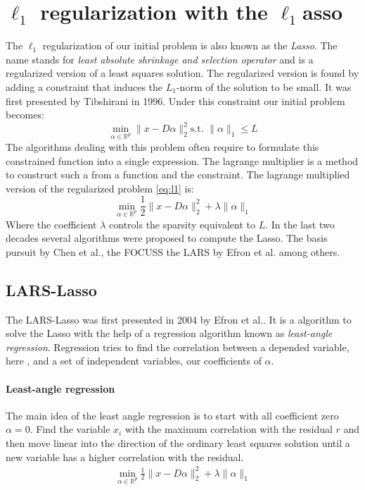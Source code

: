 \section {$\ell_1$ regularization with the $\ell_1$asso}
The $\ell_1$ regularization of our initial problem is also known as the
\emph{Lasso}. The name stands for \emph{least absolute shrinkage and
selection operator} and is a regularized version of a least squares
solution. The regularized version is found by adding a constraint that induces
the $L_1$-norm of the solution to be small. It was first presented by Tibshirani
in 1996\cite{Tibshirani1996}. Under this constraint our initial problem becomes:
\begin{equation}
\min_{\alpha\in\mathbb{R}^{p}} \lVert x - D\alpha \rVert^{2}_{2} \textrm{
s.t. } \lVert \alpha \rVert_{1} \leq L \label{eq:l1}
\end{equation}
The algorithms dealing with this problem often require to formulate this
constrained function into a single expression. The lagrange multiplier is a
method to construct such a  from a function and the constraint. The lagrange
multiplied version of the regularized problem \ref{eq:l1} is:
\begin{equation}
\min_{\alpha\in\mathbb{R}^{p}}  \frac{1}{2} \lVert x - D\alpha \rVert^{2}_{2} +
\lambda \lVert \alpha \rVert_{1}\label{eq:l1lagrange}
\end{equation}
Where the coefficient $\lambda$ controls the sparsity equivalent to $L$.
In the last two decades several algorithms were proposed to compute the
Lasso. The basis pursuit by Chen et al.\cite{Chen1995}, the FOCUSS\cite{FOCUSS}
the LARS by Efron et al.\cite{Efron2004} among others.


\subsection {LARS-Lasso}
\label{sec:lars}
The LARS-Lasso was first presented in 2004 by Efron et al.\cite{Efron2004}.
It is a algorithm to solve the Lasso with the help of a regression
algorithm known as \emph{least-angle regression}. Regression tries to find the
correlation between a depended variable, here , and a
set of independent variables, our coefficients of $\alpha$.

\paragraph{Least-angle regression}
The main idea of the least angle regression is to start with all coefficient
zero $\alpha = 0$. Find the variable $x_i$ with the maximum correlation with the
residual $r$ and then move linear into the direction of the ordinary least
squares solution until a new variable has a higher correlation with the
residual. 
\begin{align}
\min_{\alpha\in\mathbb{R}^{p}}  \frac{1}{2} \lVert x - D\alpha \rVert^{2}_{2} +
\lambda \lVert \alpha \rVert_{1}
\end{align}

